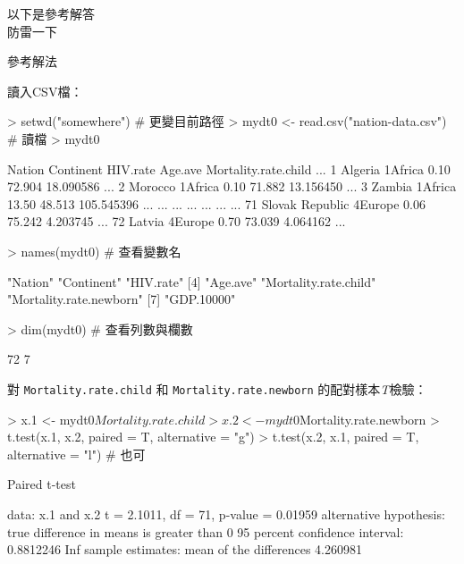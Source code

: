 \documentclass[14pt, aspectratio=43]{beamer}
\begin{document}
\begin{frame}{ }
\begin{center}
{\Huge 以下是參考解答\\ \normalsize 防雷一下}
\end{center}
\end{frame}

\begin{frame}{參考解法}

讀入CSV檔：
\begin{RC}
> setwd("somewhere") # 更變目前路徑
> mydt0 <- read.csv("nation-data.csv")  # 讀檔
> mydt0
\end{RC}
\begin{R}
            Nation Continent HIV.rate Age.ave Mortality.rate.child ...
1          Algeria   1Africa     0.10  72.904            18.090586 ...
2          Morocco   1Africa     0.10  71.882            13.156450 ...
3           Zambia   1Africa    13.50  48.513           105.545396 ...
               ...       ...      ...     ...                  ... ...
71 Slovak Republic   4Europe     0.06  75.242             4.203745 ...
72          Latvia   4Europe     0.70  73.039             4.064162 ...
\end{R}

\framebreak 

\begin{RC}
> names(mydt0)  # 查看變數名
\end{RC}
\begin{R}
[1] "Nation"     "Continent"              "HIV.rate"              
[4] "Age.ave"    "Mortality.rate.child"   "Mortality.rate.newborn"
[7] "GDP.10000" 
\end{R}
\begin{RC}
> dim(mydt0)   # 查看列數與欄數
\end{RC}
\begin{R}
[1] 72  7
\end{R}

\framebreak 

對 \verb+Mortality.rate.child+ 和 \verb+Mortality.rate.newborn+ 的配對樣本\emph{T}檢驗：
\begin{RC}
> x.1 <- mydt0$Mortality.rate.child
> x.2 <- mydt0$Mortality.rate.newborn
> t.test(x.1, x.2, paired = T, alternative = "g")
> t.test(x.2, x.1, paired = T, alternative = "l") # 也可
\end{RC}

\begin{R}
	Paired t-test

data:  x.1 and x.2
t = 2.1011, df = 71, p-value = 0.01959
alternative hypothesis: true difference in means is greater than 0
95 percent confidence interval:
 0.8812246       Inf
sample estimates:
mean of the differences 
               4.260981
\end{R}


\end{frame}
\end{document}
